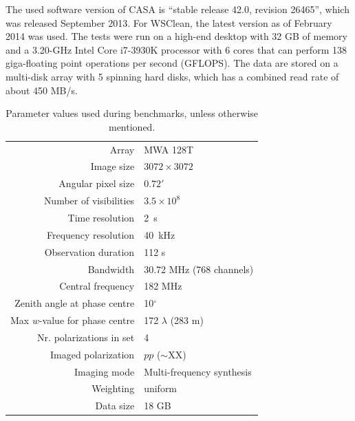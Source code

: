 \documentclass[useAMS,usenatbib]{mn2e}
\newcommand{\degree}{\ensuremath{^{\circ}}\xspace}
\begin{document}
The used software version of CASA is ``stable release 42.0, revision 26465'', which was released September 2013. For WSClean, the latest version as of February 2014 was used. The tests were run on a high-end desktop with 32 GB of memory and a 3.20-GHz Intel Core i7-3930K processor with 6 cores that can perform 138 giga-floating point operations per second (GFLOPS). The data are stored on a multi-disk array with 5 spinning hard disks, which has a combined read rate of about 450 MB/s.
\begin{table}%
\caption{Parameter values used during benchmarks, unless otherwise mentioned.} \label{tbl:default-parameters}%
\begin{center}\begin{tabular}{rl}%
\hline
Array & MWA 128T \\
Image size & $3072 \times 3072$ \\
Angular pixel size & $0.72'$ \\
Number of visibilities & $3.5 \times 10^8$ \\
Time resolution & 2~s \\
Frequency resolution & 40~kHz \\
Observation duration & 112 s\\
Bandwidth & 30.72 MHz (768 channels)\\
Central frequency & 182 MHz \\
Zenith angle at phase centre & 10\degree \\
Max $w$-value for phase centre & 172 $\lambda$ (283 m) \\
Nr. polarizations in set & 4 \\
Imaged polarization & $pp$ ($\sim$XX) \\
Imaging mode & Multi-frequency synthesis \\
Weighting & uniform \\
Data size & 18 GB \\
\hline
\end{tabular}\end{center}\end{table}
\end{document}
